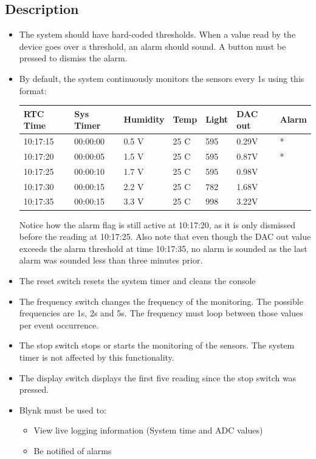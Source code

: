 \subsection{Description}
\label{sec:ProjDescription}
\begin{itemize}
    \item The system should have hard-coded thresholds. When a value read by the device goes over a threshold, an alarm should sound. A button must be pressed to dismiss the alarm.
    \item By default, the system continuously monitors the sensors every 1s using this format:
    \begin{table}[H]
    \centering
    \begin{tabular}{|l|l|l|l|l|l|l|}
    \hline
    RTC Time & Sys Timer & Humidity  & Temp  & Light & DAC out & Alarm \\ \hline
    10:17:15 & 00:00:00 & 0.5 V &   25 C    & 595 & 0.29V&* \\ \hline
    10:17:20 & 00:00:05 & 1.5 V &   25 C    & 595 & 0.87V&* \\ \hline
    10:17:25 & 00:00:10 & 1.7 V &   25 C    & 595 & 0.98V&  \\ \hline
    10:17:30 & 00:00:15 & 2.2 V &   25 C    & 782 & 1.68V&  \\ \hline
    10:17:35 & 00:00:15 & 3.3 V &   25 C    & 998 & 3.22V&  \\ \hline
    \end{tabular}
    \end{table}
    Notice how the alarm flag is still active at 10:17:20, as it is only dismissed before the reading at 10:17:25. Also note that even though the DAC out value exceeds the alarm threshold at time 10:17:35, no alarm is sounded as the last alarm was sounded less than three minutes prior. 
    \item The reset switch resets the system timer and cleans the console
    \item The frequency switch changes the frequency of the monitoring. The possible frequencies are 1s, 2s and 5s. The frequency must loop between those values per event occurrence.
    \item The stop switch stops or starts the monitoring of the sensors. The system timer is not affected by this functionality.
    \item The display switch displays the first five reading since the stop switch was pressed.
    \item Blynk must be used to:
    \begin{itemize}
        \item View live logging information (System time and ADC values)
        \item Be notified of alarms
    \end{itemize}
\end{itemize}

